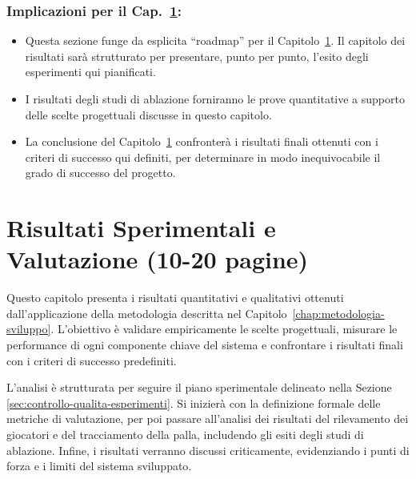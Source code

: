 \documentclass[12pt,a4paper,openright,twoside]{book}
\begin{document}
\subsection*{Implicazioni per il Cap.~\ref{chap:risultati-sperimentali}:}
\begin{itemize}
  \item Questa sezione funge da esplicita ``roadmap'' per il Capitolo~\ref{chap:risultati-sperimentali}.
  Il capitolo dei risultati sarà strutturato per presentare, punto per punto, l'esito degli esperimenti qui pianificati.
  \item I risultati degli studi di ablazione forniranno le prove quantitative a supporto delle scelte progettuali
  discusse in questo capitolo.
  \item La conclusione del Capitolo~\ref{chap:risultati-sperimentali} confronterà i risultati finali ottenuti
  con i criteri di successo qui definiti, per determinare in modo inequivocabile il grado di successo del progetto.
\end{itemize}


\chapter{Risultati Sperimentali e Valutazione (10-20 pagine)}
\label{chap:risultati-sperimentali}

Questo capitolo presenta i risultati quantitativi e qualitativi ottenuti dall'applicazione della metodologia 
descritta nel Capitolo~\ref{chap:metodologia-sviluppo}. L'obiettivo è validare empiricamente le scelte progettuali, 
misurare le performance di ogni componente chiave del sistema e confrontare i risultati finali con i criteri di 
successo predefiniti.

L'analisi è strutturata per seguire il piano sperimentale delineato nella Sezione \ref{sec:controllo-qualita-esperimenti}. 
Si inizierà con la definizione formale delle metriche di valutazione, per poi passare all'analisi dei risultati 
del rilevamento dei giocatori e del tracciamento della palla, includendo gli esiti degli studi di ablazione. 
Infine, i risultati verranno discussi criticamente, evidenziando i punti di forza e i limiti del sistema sviluppato.

\end{document}
